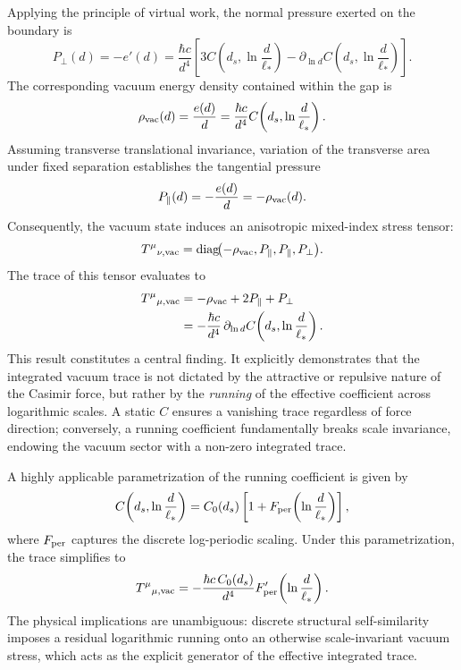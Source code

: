 \documentclass[12pt,letterpaper]{article}
\begin{document}
Applying the principle of virtual work, the normal pressure exerted on the boundary is
\begin{equation}
P_\perp(d)=-e'(d) = \frac{\hbar c}{d^4} \left[ 3C\!\left(d_s,\ln\frac{d}{\ell_*}\right) - \partial_{\ln d}C\!\left(d_s,\ln\frac{d}{\ell_*}\right) \right].
\label{eq:pperp}
\end{equation}
The corresponding vacuum energy density contained within the gap is
\begin{equation}
\rho_{\rm vac}(d)=\frac{e(d)}{d} = \frac{\hbar c}{d^4} C\!\left(d_s,\ln\frac{d}{\ell_*}\right).
\label{eq:rhovac}
\end{equation}
Assuming transverse translational invariance, variation of the transverse area under fixed separation establishes the tangential pressure
\begin{equation}
P_{\parallel}(d)=-\frac{e(d)}{d}=-\rho_{\rm vac}(d).
\label{eq:pparallel}
\end{equation}
Consequently, the vacuum state induces an anisotropic mixed-index stress tensor:
\begin{equation}
T^\mu{}_{\nu,\rm vac} = \mathrm{diag}\!\bigl(-\rho_{\rm vac},P_\parallel,P_\parallel,P_\perp\bigr).
\label{eq:vacuum_tensor_new}
\end{equation}
The trace of this tensor evaluates to
\begin{align}
T^\mu{}_{\mu,\rm vac} &= -\rho_{\rm vac}+2P_\parallel+P_\perp \nonumber\\
&= -\frac{\hbar c}{d^4} \,\partial_{\ln d}C\!\left(d_s,\ln\frac{d}{\ell_*}\right).
\label{eq:vacuum_trace_new}
\end{align}
This result constitutes a central finding. It explicitly demonstrates that the integrated vacuum trace is not dictated by the attractive or repulsive nature of the Casimir force, but rather by the \emph{running} of the effective coefficient across logarithmic scales.
A static $C$ ensures a vanishing trace regardless of force direction;
conversely, a running coefficient fundamentally breaks scale invariance, endowing the vacuum sector with a non-zero integrated trace.

A highly applicable parametrization of the running coefficient is given by
\begin{equation}
C\!\left(d_s,\ln\frac{d}{\ell_*}\right) = C_0(d_s) \left[1+F_{\rm per}\!\left(\ln\frac{d}{\ell_*}\right)\right],
\label{eq:Cdecomp}
\end{equation}
where $F_{\rm per}$ captures the discrete log-periodic scaling.
Under this parametrization, the trace simplifies to
\begin{equation}
T^\mu{}_{\mu,\rm vac} = -\frac{\hbar c\,C_0(d_s)}{d^4} F_{\rm per}'\!\left(\ln\frac{d}{\ell_*}\right).
\label{eq:vacuum_trace_periodic}
\end{equation}
The physical implications are unambiguous: discrete structural self-similarity imposes a residual logarithmic running onto an otherwise scale-invariant vacuum stress, which acts as the explicit generator of the effective integrated trace.
\end{document}
